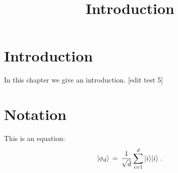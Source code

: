 

%


\title{Introduction}
\label{introduction}


\maketitle

\label{section-phantom}

\tableofcontents

\section{Introduction}
\label{section:introduction}

In this chapter we give an introduction. [edit test 5]

\section{Notation}
\label{section-notation}

This is an equation:
\begin{equation}
\label{eq:me-state}
 |\phi_d\rangle \,=\,\frac{1}{\sqrt{d}} \sum_{i=1}^d |i\rangle|i\rangle\;.
\end{equation}








